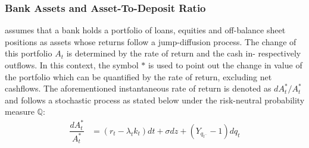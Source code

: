 \subsubsection*{Bank Assets and Asset-To-Deposit Ratio}
\citet{pennacchi2010structural} assumes that a bank holds a portfolio of loans, equities and off-balance sheet positions as assets whose returns follow a jump-diffusion process. The change of this portfolio $A_t$ is determined by the rate of return and the cash in- respectively outflows. In this context, the symbol $*$ is used to point out the change in value of the portfolio which can be quantified by the rate of return, excluding net cashflows. The aforementioned instantaneous rate of return is denoted as $d A_t^*/ A_t^*$ and follows a stochastic process as stated below under the risk-neutral probability measure $\mathbb{Q}$:
\begin{align} \label{bankassetprocess}
\dfrac{d A_t^*}{A_t^*} &= \left( r_t - \lambda_t k_t \right) dt + \sigma dz + \left( Y_{q_{t^{-}}} -1\right) dq_t
\end{align}

